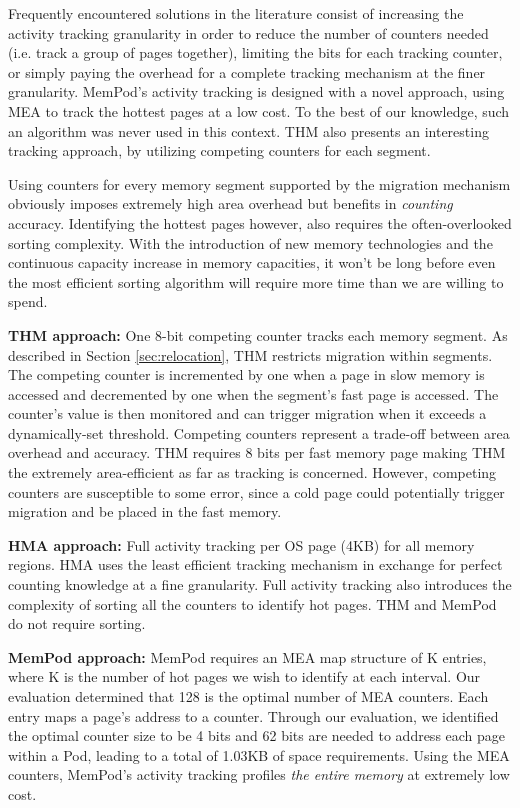 Frequently encountered solutions in the literature consist of increasing the activity tracking granularity in order to reduce the number of counters needed (i.e. track a group of pages together), limiting the bits for each tracking counter, or simply paying the overhead for a complete tracking mechanism at the finer granularity. MemPod's activity tracking  is designed with a novel approach, using MEA to track the hottest pages at a low cost. To the best of our knowledge, such an algorithm was never used in this context. THM also presents an interesting tracking approach, by utilizing competing counters for each segment.

Using counters for every memory segment supported by the migration mechanism obviously imposes extremely high area overhead but benefits in \textit{counting} accuracy. Identifying the hottest pages however, also requires the often-overlooked sorting complexity. With the introduction of new memory technologies and the continuous capacity increase in memory capacities, it won't be long before even the most efficient sorting algorithm will require more time than we are willing to spend.

	\textbf{THM approach:} One 8-bit competing counter tracks each memory segment. As described in Section \ref{sec:relocation}, THM restricts migration within segments. The competing counter is incremented by one when a page in slow memory is accessed and decremented by one when the segment's fast page is accessed. The counter's value is then monitored and can trigger migration when it exceeds a dynamically-set threshold. Competing counters represent a trade-off between area overhead and accuracy. THM requires 8 bits per fast memory page making THM the extremely area-efficient as far as tracking is concerned. However, competing counters are susceptible to some error, since a cold page could potentially trigger migration and be placed in the fast memory.

	\textbf{HMA approach:} Full activity tracking per OS page (4KB) for all memory regions. HMA uses the least efficient tracking mechanism in exchange for perfect counting knowledge at a fine granularity. Full activity tracking also introduces the complexity of sorting all the counters to identify hot pages. THM and MemPod do not require sorting.
	
	\textbf{MemPod approach:} MemPod requires an MEA map structure of K entries, where K is the number of hot pages we wish to identify at each interval. Our evaluation determined that 128 is the optimal number of MEA counters. Each entry maps a page's address to a counter. Through our evaluation, we identified the optimal counter size to be 4 bits and 62 bits are needed to address each page within a Pod, leading to a total of 1.03KB of space requirements. Using the MEA counters, MemPod's activity tracking profiles \textit{the entire memory} at extremely low cost.
	
